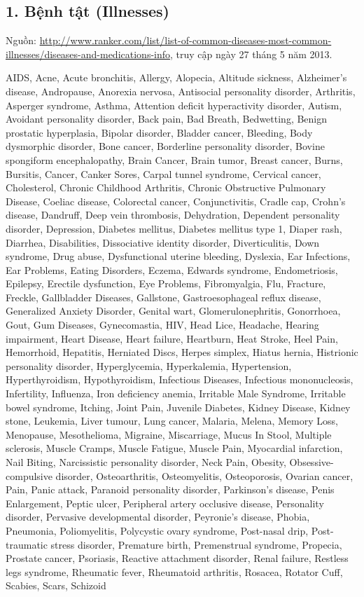 \subsection*{1. Bệnh tật (Illnesses)}

\noindent Nguồn: \url{http://www.ranker.com/list/list-of-common-diseases-most-common-illnesses/diseases-and-medications-info}, truy cập ngày 27 tháng 5 năm 2013.

\smallskip
\noindent\small AIDS, Acne, Acute bronchitis, Allergy, Alopecia, Altitude sickness, Alzheimer's disease, Andropause, Anorexia nervosa, Antisocial personality disorder, Arthritis, Asperger syndrome, Asthma, Attention deficit hyperactivity disorder, Autism, Avoidant personality disorder, Back pain, Bad Breath, Bedwetting, Benign prostatic hyperplasia, Bipolar disorder, Bladder cancer, Bleeding, Body dysmorphic disorder, Bone cancer, Borderline personality disorder, Bovine spongiform encephalopathy, Brain Cancer, Brain tumor, Breast cancer, Burns, Bursitis, Cancer, Canker Sores, Carpal tunnel syndrome, Cervical cancer, Cholesterol, Chronic Childhood Arthritis, Chronic Obstructive Pulmonary Disease, Coeliac disease, Colorectal cancer, Conjunctivitis, Cradle cap, Crohn's disease, Dandruff, Deep vein thrombosis, Dehydration, Dependent personality disorder, Depression, Diabetes mellitus, Diabetes mellitus type 1, Diaper rash, Diarrhea, Disabilities, Dissociative identity disorder, Diverticulitis, Down syndrome, Drug abuse, Dysfunctional uterine bleeding, Dyslexia, Ear Infections, Ear Problems, Eating Disorders, Eczema, Edwards syndrome, Endometriosis, Epilepsy, Erectile dysfunction, Eye Problems, Fibromyalgia, Flu, Fracture, Freckle, Gallbladder Diseases, Gallstone, Gastroesophageal reflux disease, Generalized Anxiety Disorder, Genital wart, Glomerulonephritis, Gonorrhoea, Gout, Gum Diseases, Gynecomastia, HIV, Head Lice, Headache, Hearing impairment, Heart Disease, Heart failure, Heartburn, Heat Stroke, Heel Pain, Hemorrhoid, Hepatitis, Herniated Discs, Herpes simplex, Hiatus hernia, Histrionic personality disorder, Hyperglycemia, Hyperkalemia, Hypertension, Hyperthyroidism, Hypothyroidism, Infectious Diseases, Infectious mononucleosis, Infertility, Influenza, Iron deficiency anemia, Irritable Male Syndrome, Irritable bowel syndrome, Itching, Joint Pain, Juvenile Diabetes, Kidney Disease, Kidney stone, Leukemia, Liver tumour, Lung cancer, Malaria, Melena, Memory Loss, Menopause, Mesothelioma, Migraine, Miscarriage, Mucus In Stool, Multiple sclerosis, Muscle Cramps, Muscle Fatigue, Muscle Pain, Myocardial infarction, Nail Biting, Narcissistic personality disorder, Neck Pain, Obesity, Obsessive-compulsive disorder, Osteoarthritis, Osteomyelitis, Osteoporosis, Ovarian cancer, Pain, Panic attack, Paranoid personality disorder, Parkinson's disease, Penis Enlargement, Peptic ulcer, Peripheral artery occlusive disease, Personality disorder, Pervasive developmental disorder, Peyronie's disease, Phobia, Pneumonia, Poliomyelitis, Polycystic ovary syndrome, Post-nasal drip, Post-traumatic stress disorder, Premature birth, Premenstrual syndrome, Propecia, Prostate cancer, Psoriasis, Reactive attachment disorder, Renal failure, Restless legs syndrome, Rheumatic fever, Rheumatoid arthritis, Rosacea, Rotator Cuff, Scabies, Scars, Schizoid 